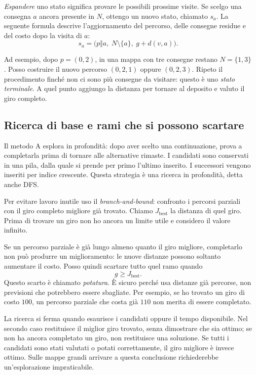 \emph{Espandere} uno stato significa provare le possibili prossime visite.
Se scelgo una consegna $a$ ancora presente in $N$, ottengo un nuovo stato,
chiamato $s_a$. La seguente formula descrive l'aggiornamento del percorso,
delle consegne residue e del costo dopo la visita di $a$:
\[
 s_a=\bigl(p\mathbin{\Vert}a,\;N\setminus\{a\},\;g+d(v,a)\bigr).
\]

Ad esempio, dopo $p=(0,2)$, in una mappa con tre consegne restano
$N=\{1,3\}$. Posso costruire il nuovo percorso $(0,2,1)$ oppure $(0,2,3)$.
Ripeto il procedimento finché non ci sono più consegne da visitare:
questo è uno \emph{stato terminale}. A quel punto aggiungo la distanza
per tornare al deposito e valuto il giro completo.

\subsection{Ricerca di base e rami che si possono scartare}
Il metodo A esplora in profondità: dopo aver scelto una continuazione,
prova a completarla prima di tornare alle alternative rimaste.
I candidati sono conservati in una pila, dalla quale si prende per primo
l'ultimo inserito. I successori vengono inseriti per indice crescente.
Questa strategia è una ricerca in profondità, detta anche DFS.

Per evitare lavoro inutile uso il \emph{branch-and-bound}: confronto i
percorsi parziali con il giro completo migliore già trovato. Chiamo
$J_{\mathrm{best}}$ la distanza di quel giro. Prima di trovare un giro non
ho ancora un limite utile e considero il valore infinito.

Se un percorso parziale è già lungo almeno quanto il giro migliore,
completarlo non può produrre un miglioramento: le nuove distanze possono
soltanto aumentare il costo. Posso quindi scartare tutto quel ramo quando
\[
 g\geq J_{\mathrm{best}}.
\]
Questo scarto è chiamato \emph{potatura}. È sicuro perché usa distanze già
percorse, non previsioni che potrebbero essere sbagliate. Per esempio,
se ho trovato un giro di costo $100$, un percorso parziale che costa già
$110$ non merita di essere completato.

La ricerca si ferma quando esaurisce i candidati oppure il tempo disponibile.
Nel secondo caso restituisce il miglior giro trovato, senza dimostrare che
sia ottimo; se non ha ancora completato un giro, non restituisce una soluzione.
Se tutti i candidati sono stati valutati o potati correttamente, il giro
migliore è invece ottimo. Sulle mappe grandi arrivare a questa conclusione
richiederebbe un'esplorazione impraticabile.

